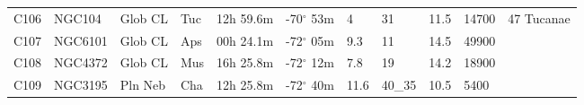 \documentclass[10pt,twoside,a4paper,english]{article}
\begin{document}
\begin{longtable}{@{}lllllllllll@{}}
C106       & NGC104      & Glob CL    & Tuc       & 12h 59.6m & -70$^{\circ}$ 53m  & 4         & 31                   & 11.5     & 14700               & 47 Tucanae                      \\ 
C107       & NGC6101     & Glob CL    & Aps       & 00h 24.1m & -72$^{\circ}$ 05m  & 9.3       & 11                   & 14.5     & 49900               &                                 \\ 
C108       & NGC4372     & Glob CL    & Mus       & 16h 25.8m & -72$^{\circ}$ 12m  & 7.8       & 19                   & 14.2     & 18900               &                                 \\ 
C109       & NGC3195     & Pln Neb    & Cha       & 12h 25.8m & -72$^{\circ}$ 40m  & 11.6      & 40\_35               & 10.5     & 5400                &                                 \\ 
\hline 
\end{longtable} 
 
 
 
 
 
\end{document}
